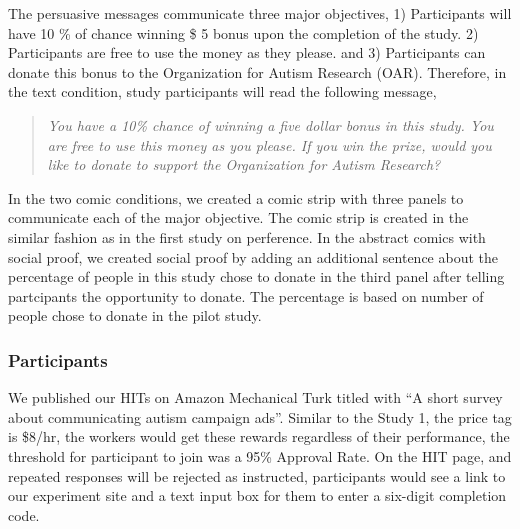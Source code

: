 The persuasive messages communicate three major objectives, 1) Participants will have 10 \% of chance winning \$ 5 bonus upon the completion of the study. 2) Participants are free to use the money as they please. and 3) Participants can donate this bonus to the Organization for Autism Research (OAR). Therefore, in the text condition, study participants will read the following message,
\begin{quote}
  \textit{You have a 10\% chance of winning a five dollar bonus in this study. You are free to use this money as you please. If you win the prize, would you like to donate to support the Organization for Autism Research?}
\end{quote}
In the two comic conditions, we created a comic strip with three panels to communicate each of the major objective. The comic strip is created in the similar fashion as in the first study on perference. In the abstract comics with social proof, we created social proof by adding an additional sentence about the percentage of people in this study chose to donate in the third panel after telling partcipants the opportunity to donate. The percentage is based on number of people chose to donate in the pilot study.


\subsubsection{Participants}
We published our HITs on Amazon Mechanical Turk titled with ``A short survey about communicating autism campaign ads''. Similar to the Study 1, the price tag is \$8/hr, the workers would get these rewards regardless of their performance, the threshold for participant to join was a 95\% Approval Rate. On the HIT page, and repeated responses will be rejected as instructed, participants would see a link to our experiment site and a text input box for them to enter a six-digit completion code.
